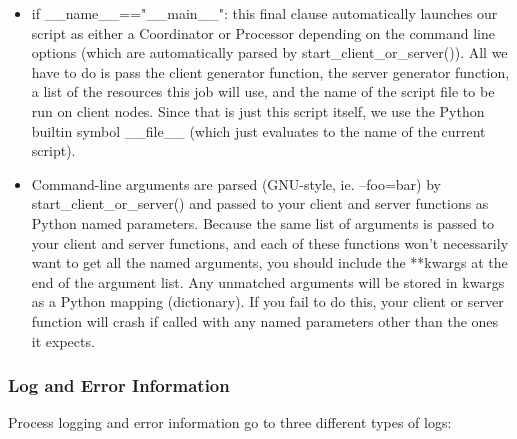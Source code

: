 \documentclass{howto}
\begin{document}
\begin{itemize}
\item
if __name__=="__main__": this final clause automatically launches our script as either a Coordinator or Processor depending on the command line options (which are automatically parsed by start_client_or_server()).  All we have to do is pass the client generator function, the server generator function, a list of the resources this job will use, and the name of the script file to be run on client nodes.  Since that is just this script itself, we use the Python builtin symbol __file__ (which just evaluates to the name of the current script).

\item     
Command-line arguments are parsed (GNU-style, ie. --foo=bar) by start_client_or_server() and passed to your client and server functions as Python named parameters.  Because the same list of arguments is passed to your client and server functions, and each of these functions won't necessarily want to get all the named arguments, you should include the **kwargs at the end of the argument list.  Any unmatched arguments will be stored in kwargs as a Python mapping (dictionary).  If you fail to do this, your client or server function will crash if called with any named parameters other than the ones it expects.
\end{itemize}

\subsubsection{Log and Error Information}

Process logging and error information go to three different types of logs:
\end{document}

